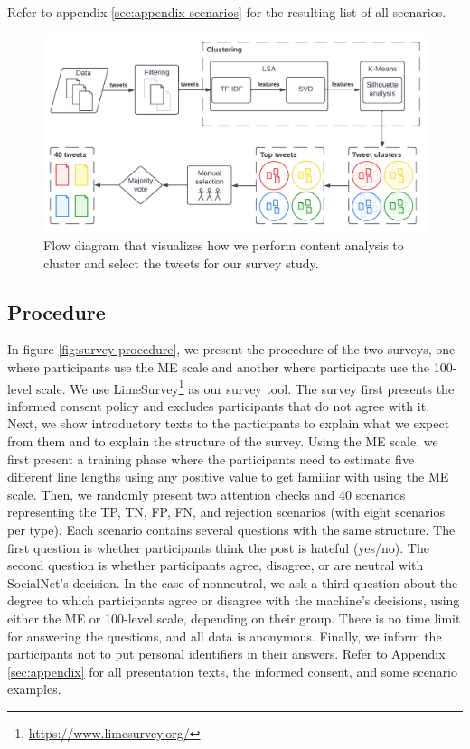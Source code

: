 %
Refer to appendix \ref{sec:appendix-scenarios} for the resulting list of all scenarios.
%

\begin{figure}
    \centering
    \includegraphics[scale=.75]{Figures/clustering.pdf}
    \caption{Flow diagram that visualizes how we perform content analysis to cluster and select the tweets for our survey study.}
    \label{fig:clustering}
\end{figure}

\subsection{Procedure}
In figure \ref{fig:survey-procedure}, we present the procedure of the two surveys, one where participants use the ME scale and another where participants use the 100-level scale.
%
We use LimeSurvey\footnote{\url{https://www.limesurvey.org/}} as our survey tool.
%
The survey first presents the informed consent policy and excludes participants that do not agree with it.
%
Next, we show introductory texts to the participants to explain what we expect from them and to explain the structure of the survey.
%
Using the ME scale, we first present a training phase where the participants need to estimate five different line lengths using any positive value to get familiar with using the ME scale.
%
Then, we randomly present two attention checks and 40 scenarios representing the TP, TN, FP, FN, and rejection scenarios (with eight scenarios per type).
%
Each scenario contains several questions with the same structure.
%
The first question is whether participants think the post is hateful (yes/no).
%
The second question is whether participants agree, disagree, or are neutral with SocialNet's decision.
%
In the case of nonneutral, we ask a third question about the degree to which participants agree or disagree with the machine's decisions, using either the ME or 100-level scale, depending on their group.
%
There is no time limit for answering the questions, and all data is anonymous.
%
Finally, we inform the participants not to put personal identifiers in their answers.
%
Refer to Appendix \ref{sec:appendix} for all presentation texts, the informed consent, and some scenario examples.

